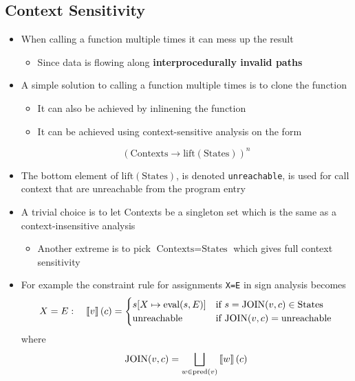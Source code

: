 \subsection{Context Sensitivity}
\begin{itemize}
  \item When calling a function multiple times it can mess up the result
  \begin{itemize}
  	\item Since data is flowing along \textbf{interprocedurally invalid paths}
  \end{itemize}
  \item A simple solution to calling a function multiple times is to clone the function
  \begin{itemize}
  	\item It can also be achieved by inlinening the function
  	\item It can be achieved using context-sensitive analysis on the form
  \end{itemize}
  \begin{equation*}
    (\text{Contexts} \rightarrow \text{lift}(\text{States}))^n
  \end{equation*}
  \item The bottom element of $\text{lift}(\text{States})$, is denoted \texttt{unreachable}, is used for call context that are unreachable from the program entry
  \item A trivial choice is to let Contexts be a singleton set which is the same as a context-insensitive analysis
  \begin{itemize}
  	\item Another extreme is to pick $\text{Contexts} = \text{States}$ which gives full context sensitivity 
  \end{itemize}
  \item For example the constraint rule for assignments \texttt{X=E} in sign analysis becomes 
  \begin{equation*}
    X = E: \quad \left\llbracket v\right\rrbracket(c) =
    \begin{cases} 
      s[X \mapsto \text{eval}(s,E)] & \text{if } s = \text{JOIN}(v,c) \in \text{States} \\
      \text{unreachable}            & \text{if } \text{JOIN}(v,c) = \text{unreachable}
    \end{cases}
  \end{equation*}
  where 
  \begin{equation*}
    \text{JOIN}(v,c) = \bigsqcup_{w \in \text{pred}(v)} \left\llbracket w\right\rrbracket(c)
  \end{equation*}
\end{itemize}

